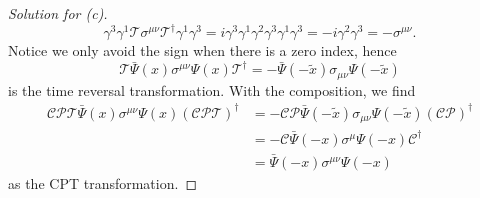 \begin{proof}[Solution for (c)]
\begin{equation*}
      \gamma^3 \gamma^1 \mathscr{T} \sigma^{\mu\nu} \mathscr{T}^\dag \gamma^1 \gamma^3 = i\gamma^3 \gamma^1 \gamma^2\gamma^3 \gamma^1 \gamma^3 = -i \gamma^2 \gamma^3 = - \sigma^{\mu\nu}.
   \end{equation*}
   Notice we only avoid the sign when there is a zero index, hence
   \begin{equation*}
      \mathscr{T} \bar{\Psi}(x) \sigma^{\mu\nu} \Psi(x) \mathscr{T}^\dag = - \bar{\Psi}(- \tilde{x}) \sigma_{\mu\nu} \Psi(- \tilde{x})
   \end{equation*}
   is the time reversal transformation. With the composition, we find
   \begin{align*}
      \mathscr{CPT} \bar{\Psi}(x) \sigma^{\mu\nu} \Psi(x)(\mathscr{CPT})^\dag &= -\mathscr{CP} \bar{\Psi}(- \tilde{x}) \sigma_{\mu\nu} \Psi(- \tilde{x}) (\mathscr{CP})^\dag\\
                                                                         &= -\mathscr{C} \bar{\Psi}(-x) \sigma^\mu \Psi(-x) \mathscr{C}^\dag\\
                                                                         &= \bar{\Psi}(-x) \sigma^{\mu\nu} \Psi(-x)
   \end{align*}
   as the CPT transformation.
\end{proof}
